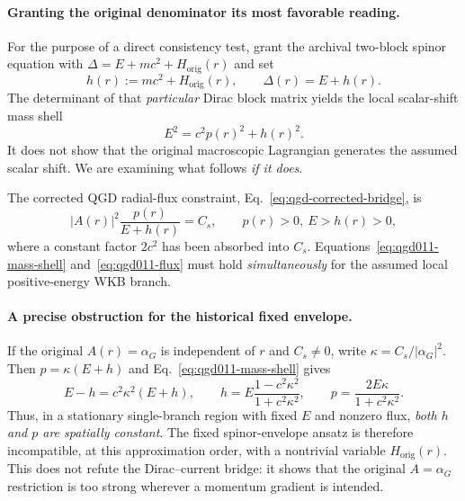 \documentclass[11pt,a4paper]{article}
\begin{document}
\paragraph{Granting the original denominator its most favorable reading.}
For the purpose of a direct consistency test, grant the archival two-block spinor equation with $\Delta=E+mc^2+H_{\mathrm{orig}}(r)$ and set
\begin{equation}\label{eq:qgd011-h-definition}
 h(r):=mc^2+H_{\mathrm{orig}}(r),\qquad \Delta(r)=E+h(r).
\end{equation}
The determinant of that \emph{particular} Dirac block matrix yields the local scalar-shift mass shell
\begin{equation}\label{eq:qgd011-mass-shell}
 \boxed{E^2=c^2p(r)^2+h(r)^2.}
\end{equation}
It does not show that the original macroscopic Lagrangian generates the assumed scalar shift. We are examining what follows \emph{if it does}.

The corrected QGD radial-flux constraint, Eq.~\eqref{eq:qgd-corrected-bridge}, is
\begin{equation}\label{eq:qgd011-flux}
 \boxed{|A(r)|^2\frac{p(r)}{E+h(r)}=C_s,\qquad p(r)>0,\ E>h(r)>0,}
\end{equation}
where a constant factor $2c^2$ has been absorbed into $C_s$.  Equations~\eqref{eq:qgd011-mass-shell} and~\eqref{eq:qgd011-flux} must hold \emph{simultaneously} for the assumed local positive-energy WKB branch.

\paragraph{A precise obstruction for the historical fixed envelope.}
If the original $A(r)=\alpha_G$ is independent of $r$ and $C_s\ne0$, write $\kappa=C_s/|\alpha_G|^2$.  Then $p=\kappa(E+h)$ and Eq.~\eqref{eq:qgd011-mass-shell} gives
\begin{equation}\label{eq:qgd011-fixed-solution}
 E-h=c^2\kappa^2(E+h),\qquad
 \boxed{h=E\frac{1-c^2\kappa^2}{1+c^2\kappa^2},\qquad
 p=\frac{2E\kappa}{1+c^2\kappa^2}.}
\end{equation}
Thus, in a stationary single-branch region with fixed $E$ and nonzero flux, \emph{both $h$ and $p$ are spatially constant}.  The fixed spinor-envelope ansatz is therefore incompatible, at this approximation order, with a nontrivial variable $H_{\mathrm{orig}}(r)$.  This does not refute the Dirac--current bridge: it shows that the original $A=\alpha_G$ restriction is too strong wherever a momentum gradient is intended.
\end{document}
